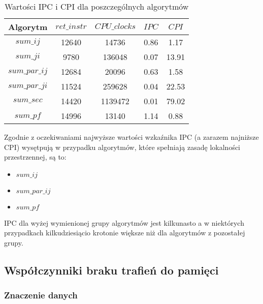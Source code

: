 \begin{table}[!ht]
\caption{Wartości IPC i CPI dla poszczególnych algorytmów}
\begin{tabular}{|c|c|c|c|c|}

\hline
  Algorytm &
  $ret\_instr$ &
  $CPU\_clocks$ &
  $IPC$ &
  $CPI$ \\

\hline
  $sum\_ij$ &
  12640 &
  14736 &
  0.86 &
  1.17 \\

\hline
  $sum\_ji$ &
  9780 &
  136048 &
  0.07 &
  13.91 \\

\hline
  $sum\_par\_ij$ &
  12684 &
  20096 &
  0.63 &
  1.58 \\

\hline
  $sum\_par\_ji$ &
  11524 &
  259628 &
  0.04 &
  22.53 \\

\hline
  $sum\_sec$ &
  14420 &
  1139472 &
  0.01 &
  79.02 \\

\hline
  $sum\_pf$ &
  14996 &
  13140 &
  1.14 &
  0.88 \\

\hline

\end{tabular}
\end{table}

Zgodnie z oczekiwaniami najwyższe wartości wzkaźnika IPC (a zarazem najniższe CPI) wysętpują w przypadku algorytmów, które spełniają zasadę lokalności przestrzennej, są to:
\begin{itemize}
\item $sum\_ij$
\item $sum\_par\_ij$
\item $sum\_pf$
\end{itemize}

IPC dla wyżej wymienionej grupy algorytmów jest kilkunasto a w niektórych przypadkach kilkudziesiącio krotonie większe niż dla algorytmów z pozostałej grupy.

\subsection{Współczynniki braku trafień do pamięci}
\label{sec:trafienia}

\subsubsection{Znaczenie danych}


